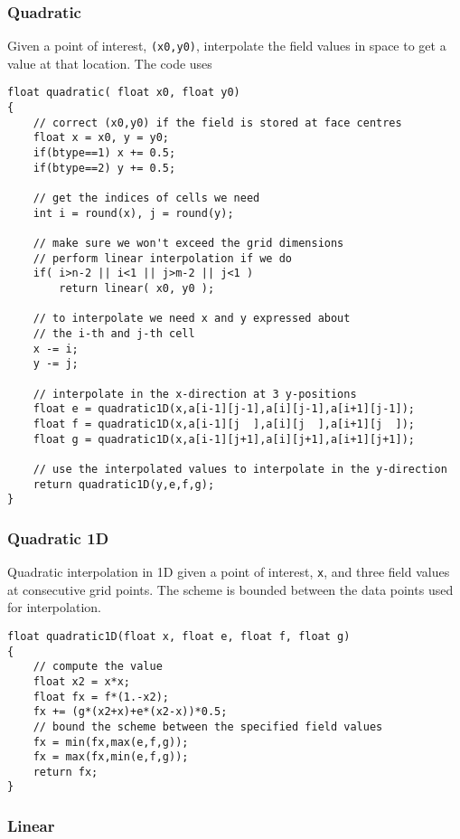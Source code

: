 \documentclass[notitlepage]{article}
\begin{document}
\subsubsection{Quadratic}

Given a point of interest, \texttt{(x0,y0)}, interpolate the field values in space to
get a value at that location. The code uses

\begin{lstlisting}[style=myCpp]
float quadratic( float x0, float y0)
{
	// correct (x0,y0) if the field is stored at face centres
	float x = x0, y = y0;
	if(btype==1) x += 0.5;
	if(btype==2) y += 0.5;
	
	// get the indices of cells we need
	int i = round(x), j = round(y);
	
	// make sure we won't exceed the grid dimensions
	// perform linear interpolation if we do
	if( i>n-2 || i<1 || j>m-2 || j<1 )
		return linear( x0, y0 );
	
	// to interpolate we need x and y expressed about
	// the i-th and j-th cell
	x -= i;
	y -= j;
	
	// interpolate in the x-direction at 3 y-positions
	float e = quadratic1D(x,a[i-1][j-1],a[i][j-1],a[i+1][j-1]);
	float f = quadratic1D(x,a[i-1][j  ],a[i][j  ],a[i+1][j  ]);
	float g = quadratic1D(x,a[i-1][j+1],a[i][j+1],a[i+1][j+1]);
	
	// use the interpolated values to interpolate in the y-direction
	return quadratic1D(y,e,f,g);
}
\end{lstlisting}

\subsubsection{Quadratic 1D}

Quadratic interpolation in 1D given a point of interest, \texttt{x}, and three field
values at consecutive grid points. The scheme is bounded between the data points
used for interpolation.

\begin{lstlisting}[style=myCpp]
float quadratic1D(float x, float e, float f, float g)
{
	// compute the value
	float x2 = x*x;
	float fx = f*(1.-x2);
	fx += (g*(x2+x)+e*(x2-x))*0.5;
	// bound the scheme between the specified field values
	fx = min(fx,max(e,f,g));
	fx = max(fx,min(e,f,g));
	return fx;
} 
\end{lstlisting}

\subsubsection{Linear}
\end{document}
